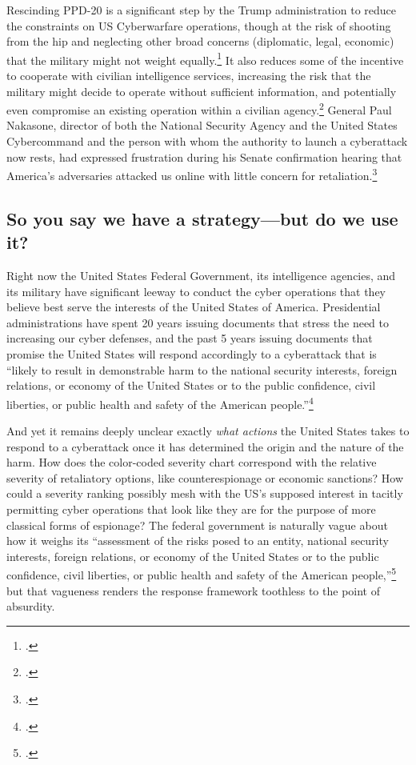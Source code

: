 \documentclass[12pt]{article}
\begin{document}
Rescinding PPD-20 is a significant step by the Trump administration to reduce the constraints on US Cyberwarfare operations, though at the risk of shooting from the hip and neglecting other broad concerns (diplomatic, legal, economic) that the military might not weight equally.\footcite{starks_ramifications_2018} It also reduces some of the incentive to cooperate with civilian intelligence services, increasing the risk that the military might decide to operate without sufficient information, and potentially even compromise an existing operation within a civilian agency.\footcite{hawkins_cybersecurity_2018} General Paul Nakasone, director of both the National Security Agency and the United States Cybercommand and the person with whom the authority to launch a cyberattack now rests, had expressed frustration during his Senate confirmation hearing that America's  adversaries attacked us online with little concern for retaliation.\footcite{sanger_trump_2018}

\subsection{So you say we have a strategy---but do we use it?}
Right now the United States Federal Government, its intelligence agencies, and its military have significant leeway to conduct the cyber operations that they believe best serve the interests of the United States of America. Presidential administrations have spent 20 years issuing documents that stress the need to increasing our cyber defenses, and the past 5 years issuing documents that promise the United States will respond accordingly to a cyberattack that is ``likely to result in demonstrable harm to the national security interests, foreign relations, or economy of the United States or to the public confidence, civil liberties, or public health and safety of the American people.''\footcite{office_of_the_press_secretary_fact_2016} 

And yet it remains deeply unclear exactly \emph{what actions} the United States takes to respond to a cyberattack once it has determined the origin and the nature of the harm. How does the color-coded severity chart correspond with the relative severity of retaliatory options, like counterespionage or economic sanctions? How could a severity ranking possibly mesh with the US's supposed interest in tacitly permitting cyber operations that look like they are for the purpose of more classical forms of espionage? The federal government is naturally vague about how it weighs its ``assessment of the risks posed to an entity, national security interests, foreign relations, or economy of the United States or to the public confidence, civil liberties, or public health and safety of the American people,''\footcite{office_of_the_press_secretary_fact_2016} but that vagueness renders the response framework toothless to the point of absurdity.
\end{document}
